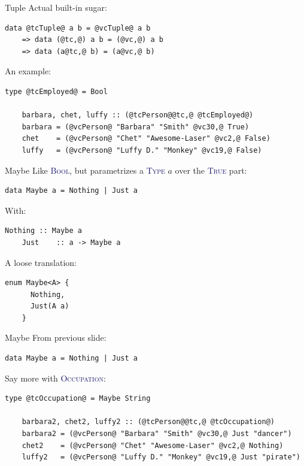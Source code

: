 \documentclass[xcolor={usenames,dvipsnames}]{beamer}
\newcommand{\htycon}[1]{\textcolor{MidnightBlue}{\textsc{#1}}}
\begin{document}
\begin{frame}[fragile]{Tuple}
  Actual built-in sugar:
  \begin{lstlisting}[style=hask]
       data @tcTuple@ a b = @vcTuple@ a b
    => data (@tc,@) a b = (@vc,@) a b
    => data (a@tc,@ b) = (a@vc,@ b)
  \end{lstlisting}

  \pause
  An example:
  \begin{lstlisting}[style=hask]
    type @tcEmployed@ = Bool

    barbara, chet, luffy :: (@tcPerson@@tc,@ @tcEmployed@)
    barbara = (@vcPerson@ "Barbara" "Smith" @vc30,@ True)
    chet    = (@vcPerson@ "Chet" "Awesome-Laser" @vc2,@ False)
    luffy   = (@vcPerson@ "Luffy D." "Monkey" @vc19,@ False)
  \end{lstlisting}
\end{frame}

\begin{frame}[fragile]{Maybe}
  Like \htycon{Bool}, but parametrizes a \htycon{Type} $a$ over the \htycon{True} part:
  \begin{lstlisting}[style=hask]
    data Maybe a = Nothing | Just a
  \end{lstlisting}

  \pause
  With:
  \begin{lstlisting}[style=hask]
    Nothing :: Maybe a
    Just    :: a -> Maybe a
  \end{lstlisting}

  \pause
  A loose translation:
  \begin{lstlisting}[style=hask]
    enum Maybe<A> {
      Nothing,
      Just(A a)
    }
  \end{lstlisting}
\end{frame}

\begin{frame}[fragile]{Maybe}
  From previous slide:
  \begin{lstlisting}[style=hask]
    data Maybe a = Nothing | Just a
  \end{lstlisting}

  \pause
  Say more with \htycon{Occupation}:
  \begin{lstlisting}[style=hask]
    type @tcOccupation@ = Maybe String

    barbara2, chet2, luffy2 :: (@tcPerson@@tc,@ @tcOccupation@)
    barbara2 = (@vcPerson@ "Barbara" "Smith" @vc30,@ Just "dancer")
    chet2    = (@vcPerson@ "Chet" "Awesome-Laser" @vc2,@ Nothing)
    luffy2   = (@vcPerson@ "Luffy D." "Monkey" @vc19,@ Just "pirate")
  \end{lstlisting}
\end{frame}
\end{document}
